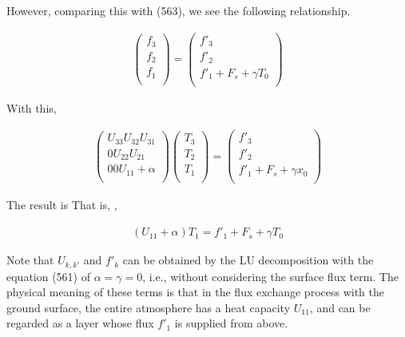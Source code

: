 However, comparing this with (563), we see the following relationship.

\begin{eqnarray}
  \left( \begin{array}{l}
         f_3 \\ f_2 \\ f_1 \\
         \end{array} \right)
 =
  \left( \begin{array}{l}
         f'_3 \\ f'_2 \\ f'_1 + F_s + \gamma T_0 \\
         \end{array} \right)
\end{eqnarray}

With this,

\begin{eqnarray}
  \left( \begin{array}{lll}
         U_{33}  U_{32}  U_{31} \\
         0       U_{22}  U_{21} \\
         0       0       U_{11} + \alpha \\
         \end{array} \right)
  \left( \begin{array}{l}
         T_3 \\ T_2 \\ T_1 \\
         \end{array} \right)
  =
  \left(  \begin{array}{l}
          f'_3 \\ f'_2 \\ f'_1 + F_s + \gamma x_0 \\
          \end{array} \right)
\end{eqnarray}

The result is That is, ,

\begin{eqnarray}
  ( U_{11} +  \alpha  ) T_1 = f'_1 + F_s + \gamma T_0
\end{eqnarray}

Note that \(U_{k,k'}\) and \(f'_k\) can be obtained by the LU
decomposition with the equation (561) of \(\alpha=\gamma=0\), i.e.,
without considering the surface flux term. The physical meaning of these
terms is that in the flux exchange process with the ground surface, the
entire atmosphere has a heat capacity \(U_{11}\), and can be regarded as
a layer whose flux \(f'_1\) is supplied from above.

